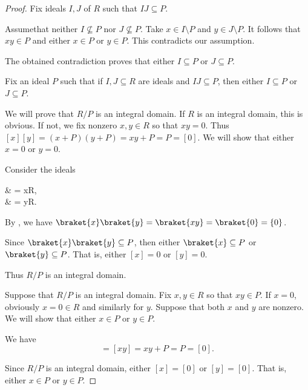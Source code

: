 \begin{proof}
   Fix ideals \( I, J \) of \( R \) such that \( IJ \subseteq P \).

  Assume\LEM that neither \( I \not\subseteq P \) nor \( J \not\subseteq P \). Take \( x \in I \setminus P \) and \( y \in J \setminus P \). It follows that \( xy \in P \) and either \( x \in P \) or \( y \in P \). This contradicts our assumption.

  The obtained contradiction proves that either \( I \subseteq P \) or \( J \subseteq P \).

   Fix an ideal \( P \) such that if \( I, J \subseteq R \) are ideals and \( IJ \subseteq P \), then either \( I \subseteq P \) or \( J \subseteq P \).

  We will prove that \( R / P \) is an integral domain. If \( R \) is an integral domain, this is obvious. If not, we fix nonzero \( x, y \in R \) so that \( xy = 0 \). Thus \( [x][y] = (x + P)(y + P) = xy + P = P = [0] \). We will show that either \( x = 0 \) or \( y = 0 \).

  Consider the ideals
  \begin{balign*}
     & = xR, \\
     & = yR.
  \end{balign*}

  By , we have \( \braket{x} \braket{y} = \braket{xy} = \braket{0} = \{ 0 \} \).

  Since \( \braket{x} \braket{y} \subseteq P \), then either \( \braket{x} \subseteq P \) or \( \braket{y} \subseteq P \). That is, either \( [x] = 0 \) or \( [y] = 0 \).

  Thus \( R / P \) is an integral domain.

   Suppose that \( R / P \) is an integral domain. Fix \( x, y \in R \) so that \( xy \in P \). If \( x = 0 \), obviously \( x = 0 \in R \) and similarly for \( y \). Suppose that both \( x \) and \( y \) are nonzero. We will show that either \( x \in P \) or \( y \in P \).

  We have
  \begin{equation*}
    [x][y] = [xy] = xy + P = P = [0].
  \end{equation*}

  Since \( R / P \) is an integral domain, either \( [x] = [0] \) or \( [y] = [0] \). That is, either \( x \in P \) or \( y \in P \).
\end{proof}

